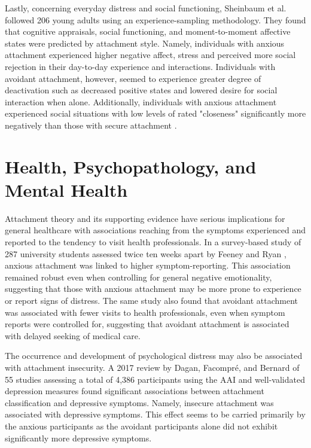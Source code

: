 \documentclass[12pt]{report}
\begin{document}
Lastly, concerning everyday distress and social functioning, Sheinbaum et al. \citeyear{Sheinbaum2015} followed 206 young adults using an experience-sampling methodology.
They found that cognitive appraisals, social functioning, and moment-to-moment affective states were predicted by attachment style.
Namely, individuals with anxious attachment experienced higher negative affect, stress and perceived more social rejection in their day-to-day experience and interactions. Individuals with avoidant attachment, however, seemed to experience greater degree of deactivation such as decreased positive states and lowered desire for social interaction when alone.
Additionally, individuals with anxious attachment experienced social situations with low levels of rated "closeness" significantly more negatively than those with secure attachment \cite{Sheinbaum2015}.

\section{Health, Psychopathology, and Mental Health}
Attachment theory and its supporting evidence have serious implications for general healthcare with associations reaching from the symptoms experienced and reported to the tendency to visit health professionals.
In a survey-based study of 287 university students assessed twice ten weeks apart by Feeney and Ryan \citeyear{Feeney1994}, anxious attachment was linked to higher symptom-reporting. This association remained robust even when controlling for general negative emotionality, suggesting that those with anxious attachment may be more prone to experience or report signs of distress.
The same study also found that avoidant attachment was associated with fewer visits to health professionals, even when symptom reports were controlled for, suggesting that avoidant attachment is associated with delayed seeking of medical care.

The occurrence and development of psychological distress may also be associated with attachment insecurity. A 2017 review by Dagan, Facompré, and Bernard \citeyear{Dagan2018} of 55 studies assessing a total of 4,386 participants using the AAI and well-validated depression measures found significant associations between attachment classification and depressive symptoms.
Namely, insecure attachment was associated with depressive symptoms. This effect seems to be carried primarily by the anxious participants as the avoidant participants alone did not exhibit significantly more depressive symptoms.
\end{document}
